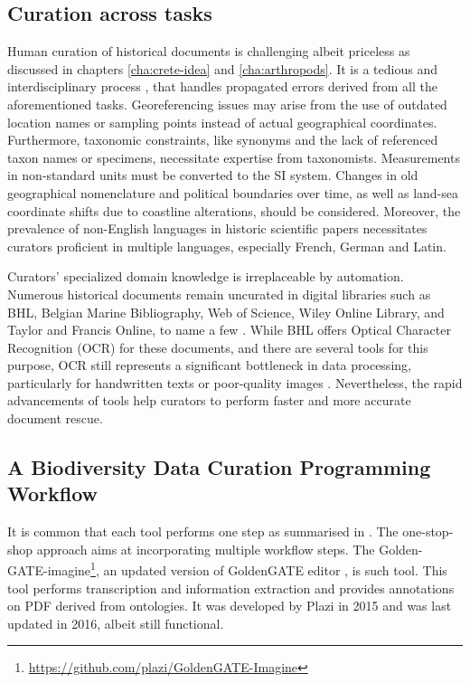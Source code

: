 \subsection{Curation across tasks}

Human curation of historical documents is challenging albeit priceless as discussed 
in chapters \ref{cha:crete-idea} and \ref{cha:arthropods}.
It is a tedious and interdisciplinary process \parencite{faulwetter_emodnet_2016,beja_chapter_2022},
that handles propagated errors derived from all the aforementioned tasks.
Georeferencing issues may arise from the use of outdated location names or sampling
points instead of actual geographical coordinates. Furthermore, taxonomic constraints, like synonyms and the lack of referenced taxon names or specimens,
necessitate expertise from taxonomists. Measurements in non-standard units must be
converted to the SI system. Changes in old geographical nomenclature and
political boundaries over time, as well as land-sea coordinate shifts due
to coastline alterations, should be considered. Moreover, the prevalence of
non-English languages in historic scientific papers necessitates curators proficient in multiple languages, 
especially French, German and Latin.

Curators' specialized domain knowledge is irreplaceable by automation.
Numerous historical documents remain uncurated in digital libraries such as BHL,
Belgian Marine Bibliography, Web of Science, Wiley Online Library, and Taylor and
Francis Online, to name a few \parencite{kearney_its_2019}. While BHL offers Optical
Character Recognition (OCR) for these documents, and there are several tools for
this purpose, OCR still represents a significant bottleneck in data processing,
particularly for handwritten texts or poor-quality images \parencite{lyal_digitising_2016}.
Nevertheless, the rapid advancements of tools help curators to perform faster and
more accurate document rescue.


\subsection{A Biodiversity Data Curation Programming Workflow}

It is common that each tool performs one step as summarised in \parencite{Paragkamian2022, beja_chapter_2022}.
The one-stop-shop approach aims at incorporating multiple workflow steps. 
The Golden-GATE-imagine\footnote{\url{https://github.com/plazi/GoldenGATE-Imagine}}, an updated
version of GoldenGATE editor \parencite{sautter_semi-automated_2007}, is such tool. This tool
performs transcription and information extraction and provides annotations on PDF derived from ontologies. It
was developed by Plazi in 2015 and was last updated in 2016, albeit still functional.

